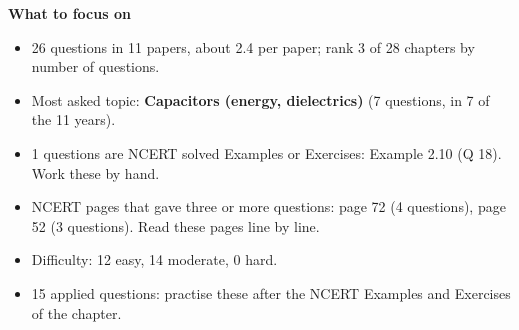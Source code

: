 \begin{minipage}[t]{0.63\linewidth}{\small\textbf{\color{crimson}What to focus on}\par\smallskip
\begin{itemize}[leftmargin=1.1em,itemsep=1pt,topsep=0pt]
\item 26 questions in 11 papers, about 2.4 per paper; rank 3 of 28 chapters by number of questions.
\item Most asked topic: \textbf{Capacitors (energy, dielectrics)} (7 questions, in 7 of the 11 years).
\item 1 questions are NCERT solved Examples or Exercises: Example 2.10 (Q 18). Work these by hand.
\item NCERT pages that gave three or more questions: page 72 (4 questions), page 52 (3 questions). Read these pages line by line.
\item Difficulty: 12 easy, 14 moderate, 0 hard.
\item 15 applied questions: practise these after the NCERT Examples and Exercises of the chapter.
\end{itemize}}\end{minipage}\par
{}
